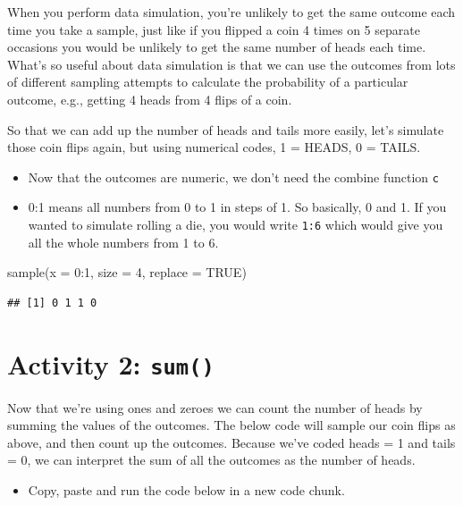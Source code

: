 \documentclass[
  oneside]{book}
\newenvironment{Shaded}{\begin{snugshade}}{\end{snugshade}}
\newcommand{\AttributeTok}[1]{\textcolor[rgb]{0.77,0.63,0.00}{#1}}
\newcommand{\ConstantTok}[1]{\textcolor[rgb]{0.00,0.00,0.00}{#1}}
\newcommand{\DecValTok}[1]{\textcolor[rgb]{0.00,0.00,0.81}{#1}}
\newcommand{\FunctionTok}[1]{\textcolor[rgb]{0.00,0.00,0.00}{#1}}
\newcommand{\NormalTok}[1]{#1}
\newcommand{\SpecialCharTok}[1]{\textcolor[rgb]{0.00,0.00,0.00}{#1}}
\providecommand{\tightlist}{%
  \setlength{\itemsep}{0pt}\setlength{\parskip}{0pt}}
\begin{document}
When you perform data simulation, you're unlikely to get the same outcome each time you take a sample, just like if you flipped a coin 4 times on 5 separate occasions you would be unlikely to get the same number of heads each time. What's so useful about data simulation is that we can use the outcomes from lots of different sampling attempts to calculate the probability of a particular outcome, e.g., getting 4 heads from 4 flips of a coin.

So that we can add up the number of heads and tails more easily, let's simulate those coin flips again, but using numerical codes, 1 = HEADS, 0 = TAILS.

\begin{itemize}
\tightlist
\item
  Now that the outcomes are numeric, we don't need the combine function \texttt{c}\\
\item
  0:1 means all numbers from 0 to 1 in steps of 1. So basically, 0 and 1. If you wanted to simulate rolling a die, you would write \texttt{1:6} which would give you all the whole numbers from 1 to 6.
\end{itemize}

\begin{Shaded}
\begin{Highlighting}[]
\FunctionTok{sample}\NormalTok{(}\AttributeTok{x =} \DecValTok{0}\SpecialCharTok{:}\DecValTok{1}\NormalTok{, }\AttributeTok{size =} \DecValTok{4}\NormalTok{, }\AttributeTok{replace =} \ConstantTok{TRUE}\NormalTok{)}
\end{Highlighting}
\end{Shaded}

\begin{verbatim}
## [1] 0 1 1 0
\end{verbatim}

\hypertarget{activity-2-sum}{%
\section{\texorpdfstring{Activity 2: \texttt{sum()}}{Activity 2: sum()}}\label{activity-2-sum}}

Now that we're using ones and zeroes we can count the number of heads by summing the values of the outcomes. The below code will sample our coin flips as above, and then count up the outcomes. Because we've coded heads = 1 and tails = 0, we can interpret the sum of all the outcomes as the number of heads.

\begin{itemize}
\tightlist
\item
  Copy, paste and run the code below in a new code chunk.
\end{itemize}
\end{document}
